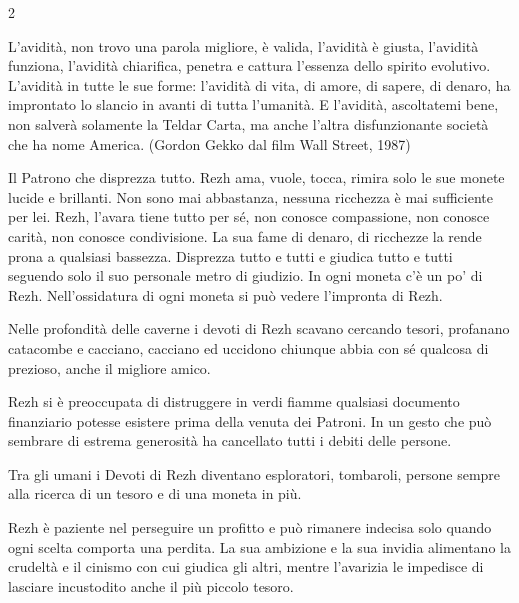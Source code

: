 \begin{multicols}{2}
\begin{enfasi}{
L'avidità, non trovo una parola migliore, è valida, l'avidità è giusta, l'avidità funziona, l'avidità chiarifica, penetra e cattura l'essenza dello spirito evolutivo. L'avidità in tutte le sue forme: l'avidità di vita, di amore, di sapere, di denaro, ha improntato lo slancio in avanti di tutta l'umanità. E l'avidità, ascoltatemi bene, non salverà solamente la Teldar Carta, ma anche l'altra disfunzionante società che ha nome America. (Gordon Gekko dal film Wall Street, 1987)
}\end{enfasi}

Il Patrono che disprezza tutto. Rezh ama, vuole, tocca, rimira solo le sue monete lucide e brillanti. Non sono mai abbastanza, nessuna ricchezza è mai sufficiente per lei. Rezh, l'avara tiene tutto per sé, non conosce compassione, non conosce carità, non conosce condivisione. La sua fame di denaro, di ricchezze la rende prona a qualsiasi bassezza. Disprezza tutto e tutti e giudica tutto e tutti seguendo solo il suo personale metro di giudizio. In ogni moneta c'è un po' di Rezh. Nell'ossidatura di ogni moneta si può vedere l'impronta di Rezh.

Nelle profondità delle caverne i devoti di Rezh scavano cercando tesori, profanano catacombe e cacciano, cacciano ed uccidono chiunque abbia con sé qualcosa di prezioso, anche il migliore amico.

Rezh si è preoccupata di distruggere in verdi fiamme qualsiasi documento finanziario potesse esistere prima della venuta dei Patroni. In un gesto che può sembrare di estrema generosità ha cancellato tutti i debiti delle persone.

Tra gli umani i Devoti di Rezh diventano esploratori, tombaroli, persone sempre alla ricerca di un tesoro e di una moneta in più.

Rezh è paziente nel perseguire un profitto e può rimanere indecisa solo quando ogni scelta comporta una perdita. La sua ambizione e la sua invidia alimentano la crudeltà e il cinismo con cui giudica gli altri, mentre l'avarizia le impedisce di lasciare incustodito anche il più piccolo tesoro.


\end{multicols}
